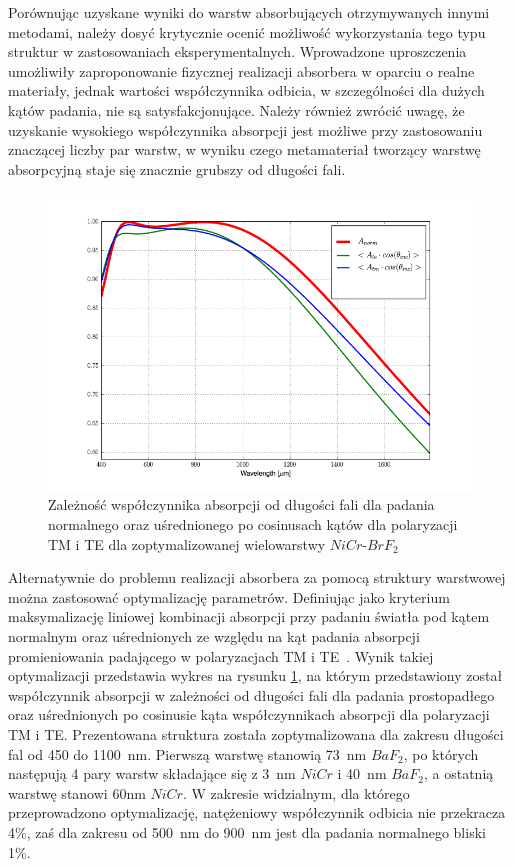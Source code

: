 Porównując uzyskane wyniki do warstw absorbujących otrzymywanych innymi metodami, należy dosyć krytycznie ocenić możliwość wykorzystania tego typu struktur w zastosowaniach eksperymentalnych. Wprowadzone uproszczenia umożliwiły zaproponowanie fizycznej realizacji absorbera w oparciu o realne materiały, jednak wartości współczynnika odbicia, w szczególności dla dużych kątów padania, nie są satysfakcjonujące. Należy również zwrócić uwagę, że uzyskanie wysokiego współczynnika absorpcji jest możliwe przy zastosowaniu znaczącej liczby par warstw, w wyniku czego metamateriał tworzący warstwę absorpcyjną staje się znacznie grubszy od długości fali. 

\begin{figure}[tb]
	\includegraphics[width=\textwidth]{images/pml/optiabsorb.png}
	\caption{Zależność współczynnika absorpcji od długości fali dla padania normalnego oraz uśrednionego po cosinusach kątów dla polaryzacji TM i TE dla zoptymalizowanej wielowarstwy $NiCr$-$BrF_2$~\cite{stefaniuk2015perfectly}}
	\label{fig:optimulti}
\end{figure}

Alternatywnie do problemu realizacji absorbera za pomocą struktury warstwowej można zastosować optymalizację parametrów. Definiując jako kryterium maksymalizację  liniowej kombinacji absorpcji przy padaniu światła pod kątem normalnym oraz uśrednionych ze względu na kąt padania absorpcji promieniowania padającego w polaryzacjach TM i TE~\cite{stefaniuk2015perfectly}. Wynik takiej optymalizacji przedstawia wykres na rysunku \ref{fig:optimulti}, na którym przedstawiony został współczynnik absorpcji w zależności od długości fali dla padania prostopadłego oraz uśrednionych po cosinusie kąta współczynnikach absorpcji dla polaryzacji TM i TE. Prezentowana struktura została zoptymalizowana dla zakresu długości fal od 450 do 1100~nm. Pierwszą warstwę stanowią 73~nm $BaF_2$, po których następują 4 pary warstw składające się z 3~nm $NiCr$ i 40~nm $BaF_2$, a ostatnią warstwę stanowi 60nm $NiCr$. W zakresie widzialnym, dla którego przeprowadzono optymalizację, natężeniowy współczynnik odbicia nie przekracza 4\%, zaś dla zakresu od 500~nm do 900~nm jest dla padania normalnego bliski 1\%.
